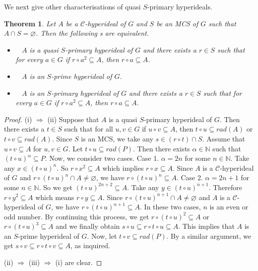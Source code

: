 \documentclass[preprint,review,10pt]{amsart}
\newtheorem{theorem}{Theorem}[section]
\theoremstyle{definition}
\theoremstyle{remark}
\numberwithin{equation}{section}
\begin{document}
We next give  other characterisations of quasi $S$-primary hyperideals.
\begin{theorem}
Let $A$ be a   $\mathcal{C}$-hyperideal of $G$ and $S$ be an MCS of $G$ such that $A \cap S=\varnothing$. Then the following s are equivalent.
\begin{itemize}
\item[\rm{(i)}]~ $A$ is a quasi $S$-primary hyperideal of $G$ and there exists a  $r \in S$ such that for every   $a \in G$ if $r \circ a^2 \subseteq A$, then $r \circ a \subseteq A$. 
\item[\rm{(ii)}]~ $A$ is an $S$-prime hyperideal of $G$.
\item[\rm{(iii)}]~ $A$ is an $S$-primary hyperideal of $G$ and there exists a  $r \in S$ such that for every   $a \in G$ if $r \circ a^2 \subseteq A$, then $r \circ a \subseteq A$.  
\end{itemize}
\end{theorem}
\begin{proof}
(i) $\Longrightarrow$ (ii) Suppose that $A$ is a quasi $S$-primary hyperideal of $G$. Then  there exists a $t \in S$ such that for all $u,v \in G$ if $u \circ v \subseteq A$, then $t \circ u \subseteq rad(A)$ or $t \circ v \subseteq rad(A)$. Since $S$ is an MCS,  we take any $s \in (r \circ t) \cap S$. Assume that $u \circ v \subseteq A$ for $u,v \in G$.  Let $t \circ u \subseteq rad(P)$. Then  there exists $\alpha \in \mathbb{N}$ such that $(t \circ u)^{\alpha} \subseteq P$. Now, we consider two cases. Case 1.  $\alpha=2n$ for some $n \in \mathbb{N}$. Take any $x \in  (t \circ u)^n$. So $ r \circ x^2 \subseteq A$ which implies  $r \circ x \subseteq A$. Since $A$ is a $\mathcal{C}$-hyperideal of $G$ and $r \circ (t \circ u)^n \cap A \neq \varnothing$, we have $r \circ (t \circ u)^n \subseteq A$. Case 2.    $\alpha=2n+1$ for some $n \in \mathbb{N}$. So we get  $(t \circ u)^{2n+2} \subseteq A$. Take any $y \in  (t \circ u)^{n+1}$. Therefore  $ r \circ y^2 \subseteq A$ which means  $r \circ y \subseteq A$. Since $r \circ (t \circ u)^{n+1} \cap A \neq \varnothing$ and $A$ is a $\mathcal{C}$-hyperideal of $G$, we have $r \circ (t \circ u)^{n+1} \subseteq A$. In these two cases, $n$ is an even or odd number. By continuing this process, we get $r \circ (t \circ u)^2 \subseteq A$ or $r \circ (t \circ u)^3 \subseteq A$ and we finally obtain $s \circ  u \subseteq r \circ t \circ u \subseteq A$. This implies that $A$ is an $S$-prime hyperideal of $G$. Now, let $t \circ v \subseteq rad(P)$. By a similar argument, we get $s \circ  v \subseteq r \circ t \circ v \subseteq A$, as inquired. 

(ii) $\Longrightarrow$ (iii) $\Longrightarrow$  (i) are clear. 
\end{proof}
\end{document}
